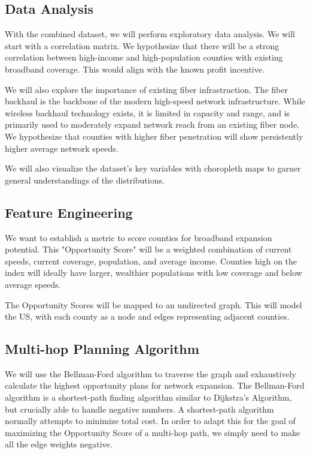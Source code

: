 \documentclass{article}
\begin{document}
\subsection{Data Analysis}

With the combined dataset, we will perform exploratory data analysis. We will start with a correlation matrix. We hypothesize that there will be a strong correlation between high-income and high-population counties with existing broadband coverage. This would align with the known profit incentive.

We will also explore the importance of existing fiber infrastruction. The fiber backhaul is the backbone of the modern high-speed network infrastructure. While wireless backhaul technology exists, it is limited in capacity and range, and is primarily used to moderately expand network reach from an existing fiber node. We hypothesize that counties with higher fiber penetration will show persistently higher average network speeds.
			
We will also visualize the dataset's key variables with choropleth maps to garner general understandings of the distributions.

\subsection{Feature Engineering}

We want to establish a metric to score counties for broadband expansion potential. This "Opportunity Score" will be a weighted combination of current speeds, current coverage, population, and average income. Counties high on the index will ideally have larger, wealthier populations with low coverage and below average speeds. 

The Opportunity Scores will be mapped to an undirected graph. This will model the US, with each county as a node and edges representing adjacent counties.

\subsection{Multi-hop Planning Algorithm}

We will use the Bellman-Ford algorithm to traverse the graph and exhaustively calculate the highest opportunity plans for network expansion. The Bellman-Ford algorithm is a shortest-path finding algorithm similar to Dijkstra's Algorithm, but crucially able to handle negative numbers. A shortest-path algorithm normally attempts to minimize total cost. In order to adapt this for the goal of maximizing the Opportunity Score of a multi-hop path, we simply need to make all the edge weights negative. 
\end{document}
